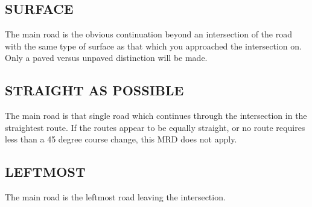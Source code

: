 \subsection{SURFACE}
The main road is the obvious continuation beyond an intersection of the road with the same type of surface as that which you approached the intersection on.  Only a paved versus unpaved distinction will be made.

\subsection{STRAIGHT AS POSSIBLE}
The main road is that single road which continues through the intersection in the straightest route.  If the routes appear to be equally straight, or no route requires less than a 45 degree course change, this MRD does not apply.

\subsection{LEFTMOST}
The main road is the leftmost road leaving the intersection.